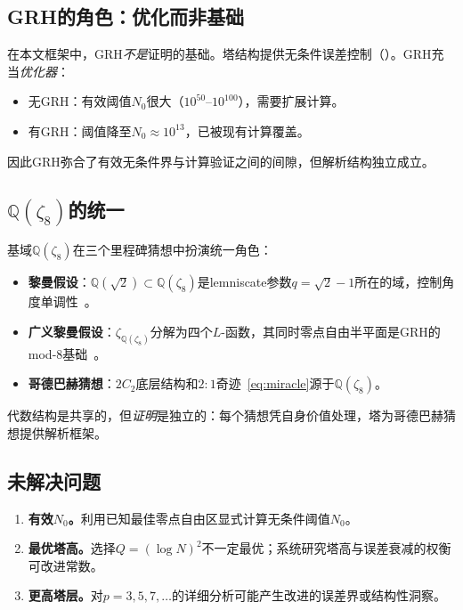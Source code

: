 \documentclass[11pt,a4paper]{article}
\theoremstyle{remark}
\newcommand{\Q}{\mathbb{Q}}
\begin{document}
\subsection{GRH的角色：优化而非基础}

在本文框架中，GRH\emph{不是}证明的基础。塔结构提供无条件误差控制（）。GRH充当\emph{优化器}：
\begin{itemize}[nosep]
  \item 无GRH：有效阈值$N_0$很大（$10^{50}$--$10^{100}$），需要扩展计算。
  \item 有GRH：阈值降至$N_0 \approx 10^{13}$，已被现有计算覆盖。
\end{itemize}
因此GRH弥合了有效无条件界与计算验证之间的间隙，但解析结构独立成立。

\subsection{$\Q(\zeta_8)$的统一}

基域$\Q(\zeta_8)$在三个里程碑猜想中扮演统一角色：
\begin{itemize}[nosep]
  \item \textbf{黎曼假设}：$\Q(\sqrt{2}) \subset \Q(\zeta_8)$是lemniscate参数$q = \sqrt{2}-1$所在的域，控制角度单调性~\cite{Chen2026RH}。
  \item \textbf{广义黎曼假设}：$\zeta_{\Q(\zeta_8)}$分解为四个$L$-函数，其同时零点自由半平面是GRH的mod-8基础~\cite{Chen2026GRH}。
  \item \textbf{哥德巴赫猜想}：$2C_2$底层结构和$2{:}1$奇迹~\eqref{eq:miracle}源于$\Q(\zeta_8)$。
\end{itemize}

代数结构是共享的，但\emph{证明}是独立的：每个猜想凭自身价值处理，塔为哥德巴赫猜想提供解析框架。

\subsection{未解决问题}
\begin{enumerate}[nosep]
  \item \textbf{有效$N_0$。}利用已知最佳零点自由区显式计算无条件阈值$N_0$。
  \item \textbf{最优塔高。}选择$Q = (\log N)^2$不一定最优；系统研究塔高与误差衰减的权衡可改进常数。
  \item \textbf{更高塔层。}对$p=3,5,7,\ldots$的详细分析可能产生改进的误差界或结构性洞察。
\end{enumerate}
\end{document}
